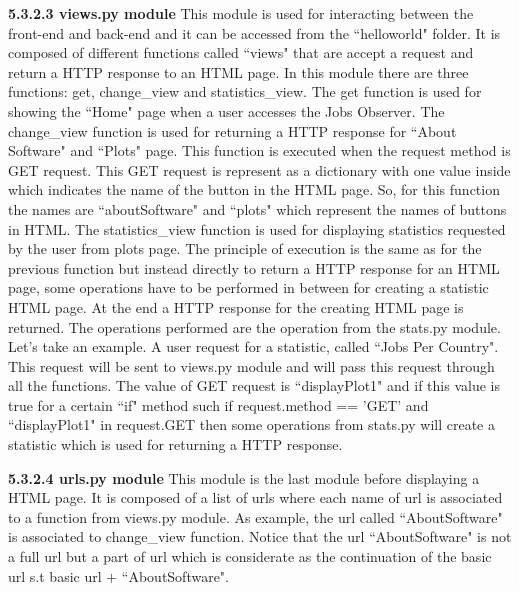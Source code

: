 \documentclass[conference,compsoc]{IEEEtran}
\begin{document}
\noindent
\newline\newline
\textbf{5.3.2.3 views.py module}
\newline\newline
This module is used for interacting between the front-end and back-end and it can be accessed from the ``helloworld" folder. It is composed of different functions called ``views" that are accept a request and return a HTTP response to an HTML page. In this module there are three functions: get, change\_view and statistics\_view. 
\newline                                                                                                                                       
The get function is used for showing the ``Home" page when a user accesses the Jobs Observer. The change\_view function is used for returning a HTTP response for ``About Software" and ``Plots" page. This function is executed when the request method is GET request. This GET request is represent as a dictionary with one value inside which indicates the name of the button in the HTML page. So, for this function the names are ``aboutSoftware" and ``plots" which represent the names of buttons in HTML.    
\newline
The statistics\_view function is used for displaying statistics requested by the user from plots page. The principle of execution is the same as for the previous function but instead directly to return a HTTP response for an HTML page, some operations have to be performed in between for creating a statistic HTML page. At the end a HTTP response for the creating HTML page is returned. The operations performed are the operation from the stats.py module. Let's take an example. A user request for a statistic, called ``Jobs Per Country". This request will be sent to views.py module and will pass this request through all the functions. The value of GET request is ``displayPlot1" and if this value is true for a certain ``if" method such if request.method == 'GET' and ``displayPlot1" in request.GET then some operations from stats.py will create a statistic which is used for returning a HTTP response. 

\noindent
\newline\newline
\textbf{5.3.2.4 urls.py module}
\newline\newline
This module is the last module before displaying a HTML page. It is composed of a list of urls where each name of url is associated to a function from views.py module. As example, the url called ``AboutSoftware" is associated to change\_view function.  Notice that the url ``AboutSoftware" is not a full url but a part of url which is considerate as the continuation of the basic url s.t basic url $+$ ``AboutSoftware".
\end{document}
